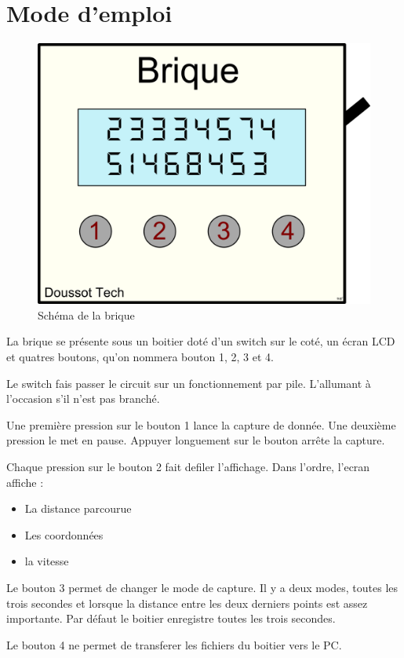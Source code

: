 \documentclass[a4paper,12pt,titlepage]{article}
\begin{document}
\section{Mode d'emploi}

\begin{figure}[H]
	\centering
	\includegraphics[width=\textwidth]{brique_dessin.png}
	\caption{Schéma de la brique}
	\label{brique_dessin}
\end{figure}

La brique se présente sous un boitier doté d'un switch sur le coté, un écran LCD et quatres boutons, qu'on nommera bouton 1, 2, 3 et 4.

\bigskip
Le switch fais passer le circuit sur un fonctionnement par pile. L'allumant à l'occasion s'il n'est pas branché.

Une première pression sur le bouton 1 lance la capture de donnée. Une deuxième pression le met en pause. Appuyer longuement sur le bouton arrête la capture.

Chaque pression sur le bouton 2 fait defiler l'affichage. Dans l'ordre, l'ecran affiche : 
\begin{itemize}
\item La distance parcourue
\item Les coordonnées
\item la vitesse
\end{itemize}

Le bouton 3 permet de changer le mode de capture. Il y a deux modes, toutes les trois secondes et lorsque la distance entre les deux derniers points est assez importante.
Par défaut le boitier enregistre toutes les trois secondes.

Le bouton 4 ne permet de transferer les fichiers du boitier vers le PC.
\end{document}

